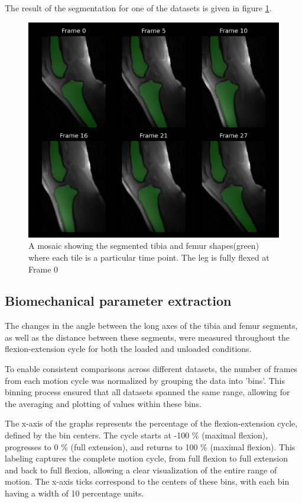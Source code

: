 \documentclass{micro-econ-thesis}
\begin{document}
The result of the segmentation for one of the datasets is given in figure \ref{fig:fullsegmented}. 

\begin{figure}[H]
	\centering
	\includegraphics[width=0.7\linewidth]{full_segmented}
	\caption{A mosaic showing the segmented tibia and femur shapes(green) where each tile is a particular time point. The leg is fully flexed at Frame 0}
	\label{fig:fullsegmented}
\end{figure}

\subsection{Biomechanical parameter extraction}
The changes in the angle between the long axes of the tibia and femur segments, as well as the distance between these segments, were measured throughout the flexion-extension cycle for both the loaded and unloaded conditions.

To enable consistent comparisons across different datasets, the number of frames from each motion cycle was normalized by grouping the data into 'bins'. This binning process ensured that all datasets spanned the same range, allowing for the averaging and plotting of values within these bins.

The x-axis of the graphs represents the percentage of the flexion-extension cycle, defined by the bin centers. The cycle starts at -100 \% (maximal flexion), progresses to 0 \% (full extension), and returns to 100 \% (maximal flexion). This labeling captures the complete motion cycle, from full flexion to full extension and back to full flexion, allowing a clear visualization of the entire range of motion. The x-axis ticks correspond to the centers of these bins, with each bin having a width of 10 percentage units. 
\end{document}
